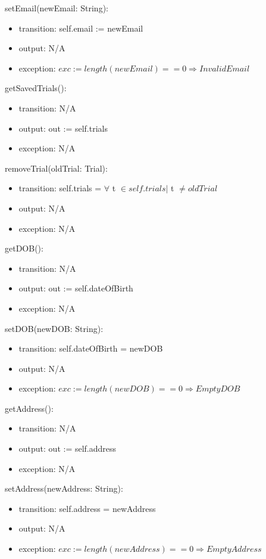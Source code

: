 \documentclass[12pt, titlepage]{article}
\begin{document}
\noindent setEmail(newEmail: String):
\begin{itemize}
\item transition: self.email := newEmail
\item output: N/A
\item exception: $exc := length(newEmail) == 0  \Rightarrow InvalidEmail$
\end{itemize}

\noindent getSavedTrials():
\begin{itemize}
\item transition: N/A
\item output: out := self.trials
\item exception: N/A
\end{itemize}

\noindent removeTrial(oldTrial: Trial):
\begin{itemize}
\item transition: self.trials = $\forall$ t $\in self.trials |$ t $\neq oldTrial$
\item output: N/A
\item exception: N/A
\end{itemize}

\noindent getDOB():
\begin{itemize}
\item transition: N/A
\item output: out := self.dateOfBirth
\item exception: N/A
\end{itemize}

\noindent setDOB(newDOB: String):
\begin{itemize}
\item transition: self.dateOfBirth = newDOB
\item output: N/A
\item exception: $exc := length(newDOB) == 0 \Rightarrow EmptyDOB$
\end{itemize}

\noindent getAddress():
\begin{itemize}
\item transition: N/A
\item output: out := self.address
\item exception: N/A
\end{itemize}

\noindent setAddress(newAddress: String):
\begin{itemize}
\item transition: self.address = newAddress
\item output: N/A
\item exception: $exc := length(newAddress) == 0 \Rightarrow EmptyAddress$
\end{itemize}
\end{document}
